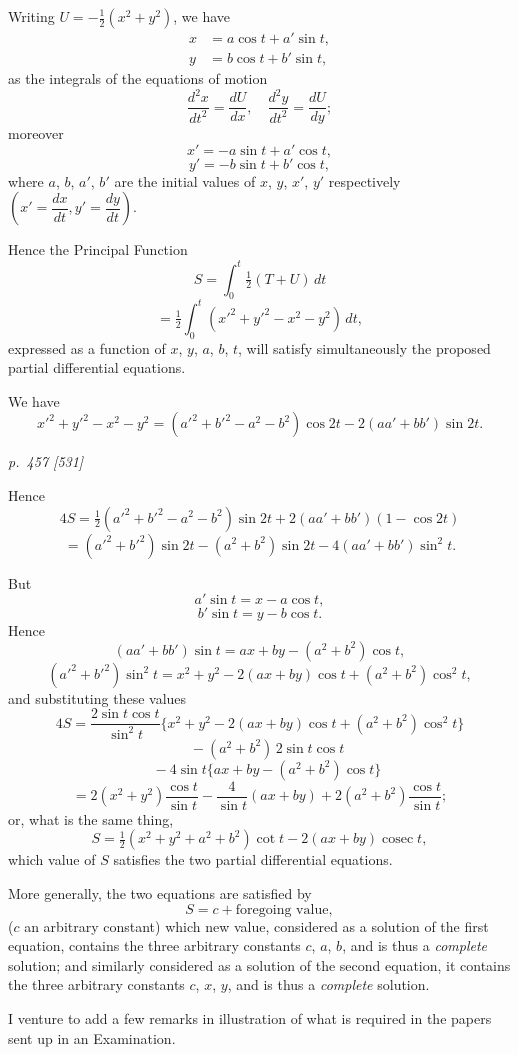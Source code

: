 \documentclass[11pt,a4paper]{article}
\theoremstyle{plain}
\theoremstyle{definition}
\newcommand{\dd}{\,d}
\newcommand{\cosec}{\operatorname{cosec}}
\begin{document}
\medskip
Writing $U=-\tfrac12(x^2+y^2)$, we have
\begin{align*}
x &= a\cos t + a'\sin t,\\
y &= b\cos t + b'\sin t,
\end{align*}
as the integrals of the equations of motion
\[
\frac{d^2x}{dt^2}=\frac{dU}{dx}, \quad \frac{d^2y}{dt^2}=\frac{dU}{dy};
\]
moreover
\[
x' = -a\sin t + a'\cos t,
\]
\[
y' = -b\sin t + b'\cos t,
\]
where $a$, $b$, $a'$, $b'$ are the initial values of $x$, $y$, $x'$, $y'$ respectively $\left(x' = \dfrac{dx}{dt}, y' = \dfrac{dy}{dt}\right)$.

Hence the Principal Function
\[
S = \int_0^t \tfrac{1}{2}(T + U) \dd t
\]
\[
= \tfrac{1}{2}\int_0^t (x'^2 + y'^2 - x^2 - y^2)\,dt,
\]
expressed as a function of $x$, $y$, $a$, $b$, $t$, will satisfy simultaneously the proposed partial
differential equations.

We have
\[
x'^2 + y'^2 - x^2 - y^2 = (a'^2+b'^2-a^2-b^2)\cos 2t-2(aa'+bb')\sin 2t.
\]

\clearpage

\bigskip
\textit{p.~457 [531]}
\smallskip

Hence
\[
4S = \tfrac{1}{2}(a'^2 + b'^2 - a^2 - b^2)\sin 2t + 2(aa' + bb')(1 - \cos 2t)
\]
\[
= (a'^2+b'^2)\sin 2t-(a^2+b^2)\sin 2t-4(aa'+bb')\sin^2 t.
\]

But
\[
a'\sin t=x-a\cos t,
\]
\[
b'\sin t=y-b\cos t.
\]
Hence
\[
(aa'+bb')\sin t=ax+by-(a^2+b^2)\cos t,
\]
\[
(a'^2+b'^2)\sin^2 t=x^2+y^2-2(ax+by)\cos t+(a^2+b^2)\cos^2 t,
\]
and substituting these values
\[
4S=\frac{2\sin t\cos t}{\sin^2 t}
\{x^2+y^2-2(ax+by)\cos t+(a^2+b^2)\cos^2 t\}
\]
\[
\quad -(a^2+b^2)\,2\sin t\cos t
\]
\[
\quad -4\sin t\{ax+by-(a^2+b^2)\cos t\}
\]
\[
=2(x^2+y^2)\frac{\cos t}{\sin t}
-\frac{4}{\sin t}(ax+by)+2(a^2+b^2)\frac{\cos t}{\sin t};
\]
or, what is the same thing,
\[
S=\tfrac12(x^2+y^2+a^2+b^2)\cot t-2(ax+by)\cosec t,
\]
which value of $S$ satisfies the two partial differential equations.

More generally, the two equations are satisfied by
\[
S=c+\text{foregoing value},
\]
($c$ an arbitrary constant) which new value, considered as a solution of the first equation,
contains the three arbitrary constants $c$, $a$, $b$, and is thus a \textit{complete} solution; and
similarly considered as a solution of the second equation, it contains the three arbitrary
constants $c$, $x$, $y$, and is thus a \textit{complete} solution.

I venture to add a few remarks in illustration of what is required in the papers
sent up in an Examination.
\end{document}
